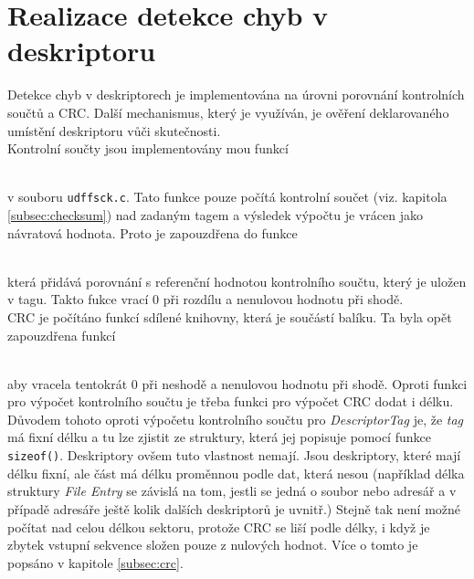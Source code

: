 \section{Realizace detekce chyb v deskriptoru}
\label{sec:realizace-detekce}
Detekce chyb v deskriptorech je implementována na úrovni porovnání kontrolních součtů a CRC. Další mechanismus, který je využíván, je ověření deklarovaného umístění deskriptoru vůči skutečnosti.\\
Kontrolní součty jsou implementovány mou funkcí\\
\centerline{\texttt{}}\\
v souboru \texttt{udffsck.c}. Tato funkce pouze počítá kontrolní součet (viz. kapitola \ref{subsec:checksum}) nad zadaným tagem a výsledek výpočtu je vrácen jako návratová hodnota. Proto je zapouzdřena do funkce\\ 
\centerline{\texttt{}}\\
která přidává porovnání s referenční hodnotou kontrolního součtu, který je uložen v tagu. Takto fukce vrací 0 při rozdílu a nenulovou hodnotu při shodě.\\
CRC je počítáno funkcí sdílené knihovny, která je součástí balíku. Ta byla opět zapouzdřena funkcí\\
\centerline{\texttt{}}\\
aby vracela tentokrát 0 při neshodě a nenulovou hodnotu při shodě. Oproti funkci pro výpočet kontrolního součtu je třeba funkci pro výpočet CRC dodat i délku. Důvodem tohoto oproti výpočetu kontrolního součtu pro \textit{DescriptorTag} je, že \textit{tag} má fixní délku a tu lze zjistit ze struktury, která jej popisuje pomocí funkce \texttt{sizeof()}. Deskriptory ovšem tuto vlastnost nemají. Jsou deskriptory, které mají délku fixní, ale část má délku proměnnou podle dat, která nesou (například délka struktury \textit{File Entry} se závislá na tom, jestli se jedná o soubor nebo adresář a v případě adresáře ještě kolik dalších deskriptorů je uvnitř.) Stejně tak není možné počítat nad celou délkou sektoru, protože CRC se liší podle délky, i když je zbytek vstupní sekvence složen pouze z nulových hodnot. Více o tomto je popsáno v kapitole \ref{subsec:crc}.

